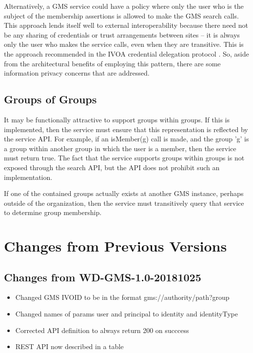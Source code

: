 \documentclass[11pt,a4paper]{ivoa}
\begin{document}
Alternatively, a GMS service could have a policy where only the user who is the subject of the membership assertions is allowed to make the GMS search calls.  This approach lends itself well to external interoperability because there need not be any sharing of credentials or trust arrangements between sites -- it is always only the user who makes the service calls, even when they are transitive.  This is the approach recommended in the  IVOA credential delegation protocol \citep{std:CDP}.  So, aside from the architectural benefits of employing this pattern, there are some information privacy concerns that are addressed.

\subsection{Groups of Groups}

It may be functionally attractive to support groups within groups.  If this is implemented, then the service must ensure that this representation is reflected by the service API.  For example, if an isMember(g) call is made, and the group 'g' is a group within another group in which the user is a member, then the service must return true.  The fact that the service supports groups within groups is not exposed through the search API, but the API does not prohibit such an implementation.

If one of the contained groups actually exists at another GMS instance, perhaps outside of the organization, then the service must transitively query that service to determine group membership.

\appendix

\section{Changes from Previous Versions}

\subsection{Changes from WD-GMS-1.0-20181025}
\begin{itemize}
\item{Changed GMS IVOID to be in the format gms://authority/path?group}
\item{Changed names of params user and principal to identity and identityType}
\item{Corrected API definition to always return 200 on succcess}
\item{REST API now described in a table}
\end{itemize}



\end{document}
